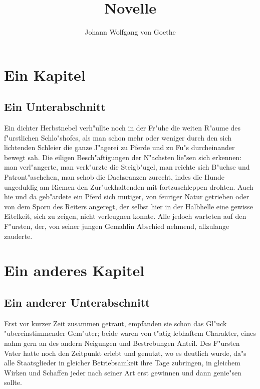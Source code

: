 \documentclass[color, ddc]{tudbook}
\begin{document}
    \title{Novelle}
    \author{Johann Wolfgang von Goethe}
    \maketitle

    \tableofcontents
    
    \blindtext

    \chapter{Ein Kapitel}
    \section{Ein Unterabschnitt}

    Ein dichter Herbstnebel verh"ullte noch in der Fr"uhe die weiten R"aume des
    f"urstlichen Schlo"shofes, als man schon mehr oder weniger durch den sich
    lichtenden Schleier die ganze J"agerei zu Pferde und zu Fu"s durcheinander
    bewegt sah. Die eiligen Besch"aftigungen der N"achsten lie"sen sich erkennen:
    man verl"angerte, man verk"urzte die Steigb"ugel, man reichte sich B"uchse
    und Patront"aschchen, man schob die Dachsranzen zurecht, indes die Hunde
    ungeduldig am Riemen den Zur"uckhaltenden mit fortzuschleppen drohten. Auch
    hie und da geb"ardete ein Pferd sich mutiger, von feuriger Natur getrieben
    oder von dem Sporn des Reiters angeregt, der selbst hier in der Halbhelle
    eine gewisse Eitelkeit, sich zu zeigen, nicht verleugnen konnte. Alle jedoch
    warteten auf den F"ursten, der, von seiner jungen Gemahlin Abschied nehmend,
    allzulange zauderte.

    \chapter{Ein anderes Kapitel}
    \section{Ein anderer Unterabschnitt}
    
    Erst vor kurzer Zeit zusammen getraut, empfanden sie schon das Gl"uck
    "ubereinstimmender Gem"uter; beide waren von t"atig lebhaftem Charakter, eines
    nahm gern an des andern Neigungen und Bestrebungen Anteil. Des F"ursten Vater
    hatte noch den Zeitpunkt erlebt und genutzt, wo es deutlich wurde, da"s alle
    Staatsglieder in gleicher Betriebsamkeit ihre Tage zubringen, in gleichem
    Wirken und Schaffen jeder nach seiner Art erst gewinnen und dann genie"sen sollte.
\end{document}
